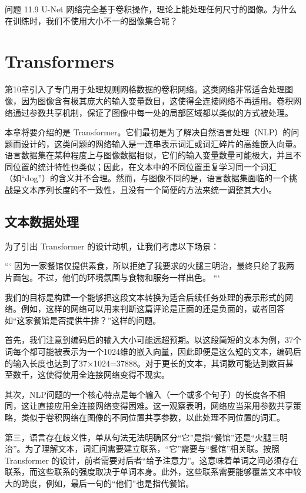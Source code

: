 \documentclass[lang=cn,newtx,10pt,scheme=chinese]{elegantbook}
\begin{document}
问题 11.9 U-Net 网络完全基于卷积操作，理论上能处理任何尺寸的图像。为什么在训练时，我们不使用大小不一的图像集合呢？

\chapter{Transformers}

第10章引入了专门用于处理规则网格数据的卷积网络。这类网络非常适合处理图像，因为图像含有极其庞大的输入变量数目，这使得全连接网络不再适用。卷积网络通过参数共享机制，保证了图像中每一处的局部区域都以类似的方式被处理。

本章将要介绍的是 Transformer。它们最初是为了解决自然语言处理（NLP）的问题而设计的，这类问题的网络输入是一连串表示词汇或词汇碎片的高维嵌入向量。语言数据集在某种程度上与图像数据相似，它们的输入变量数量可能极大，并且不同位置的统计特性也类似；因此，在文本中的不同位置重复学习同一个词汇（如“dog”）的含义并不合理。然而，与图像不同的是，语言数据集面临的一个挑战是文本序列长度的不一致性，且没有一个简便的方法来统一调整其大小。

\section{文本数据处理}
为了引出 Transformer 的设计动机，让我们考虑以下场景：

```
因为一家餐馆仅提供素食，所以拒绝了我要求的火腿三明治，最终只给了我两片面包。不过，他们的环境氛围与食物和服务一样出色。
```

我们的目标是构建一个能够把这段文本转换为适合后续任务处理的表示形式的网络。例如，这样的网络可以用来判断这篇评论是正面的还是负面的，或者回答如“这家餐馆是否提供牛排？”这样的问题。

首先，我们注意到编码后的输入大小可能远超预期。以这段简短的文本为例，37个词每个都可能被表示为一个1024维的嵌入向量，因此即便是这么短的文本，编码后的输入长度也达到了37×1024=37888。对于更长的文本，其词数可能达到数百甚至数千，这使得使用全连接网络变得不现实。

其次，NLP问题的一个核心特点是每个输入（一个或多个句子）的长度各不相同，这让直接应用全连接网络变得困难。这一观察表明，网络应当采用参数共享策略，类似于卷积网络在图像的不同位置共享参数，以此处理不同位置的词汇。

第三，语言存在歧义性，单从句法无法明确区分“它”是指“餐馆”还是“火腿三明治”。为了理解文本，词汇间需要建立联系，“它”需要与“餐馆”相关联。按照 Transformer 的设计，前者需要对后者“给予注意力”。这意味着单词之间必须存在联系，而这些联系的强度取决于单词本身。此外，这些联系需要能够覆盖文本中较大的跨度，例如，最后一句的“他们”也是指代餐馆。
\end{document}
